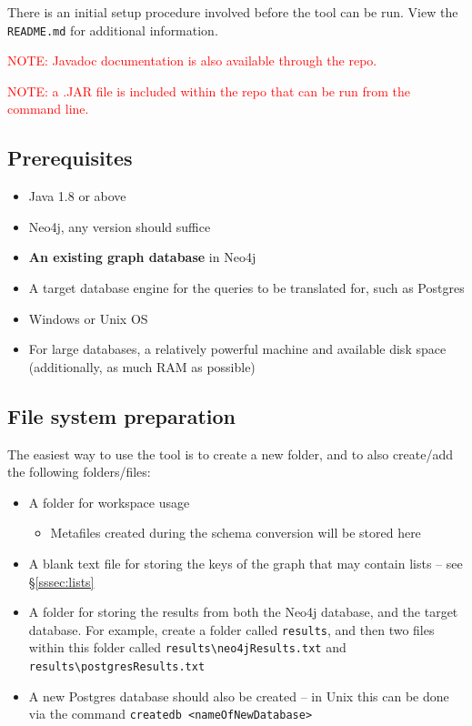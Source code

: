 \documentclass[letterpaper]{ltxdoc}
\begin{document}
\medskip

There is an initial setup procedure involved before the tool can be run. View the \texttt{README.md} for additional information.

\medskip

\textcolor{red}{NOTE: Javadoc documentation is also available through the repo.}

\medskip

\textcolor{red}{NOTE: a .JAR file is included within the repo that can be run from the command line.}

\subsection{Prerequisites}
\begin{itemize}
\item Java 1.8 or above
\item Neo4j, any version should suffice
\item \textbf{An existing graph database} in Neo4j
\item A target database engine for the queries to be translated for, such as Postgres
\item Windows or Unix OS
\item For large databases, a relatively powerful machine and available disk space (additionally, as much RAM as possible)
\end{itemize}


\subsection{File system preparation}
The easiest way to use the tool is to create a new folder, and to also create/add the following folders/files:

\begin{itemize}
\item A folder for workspace usage
\begin{itemize}
\item Metafiles created during the schema conversion will be stored here
\end{itemize}
\item A blank text file for storing the keys of the graph that may contain lists -- see \S \ref{sssec:lists}
\item A folder for storing the results from both the Neo4j database, and the target database. For example, create a folder called \texttt{results}, and then two files within this folder called \texttt{results\textbackslash neo4jResults.txt} and \texttt{results\textbackslash postgresResults.txt}
\item A new Postgres database should also be created -- in Unix this can be done via the command \texttt{createdb <nameOfNewDatabase>}
\end{itemize}
\end{document}
